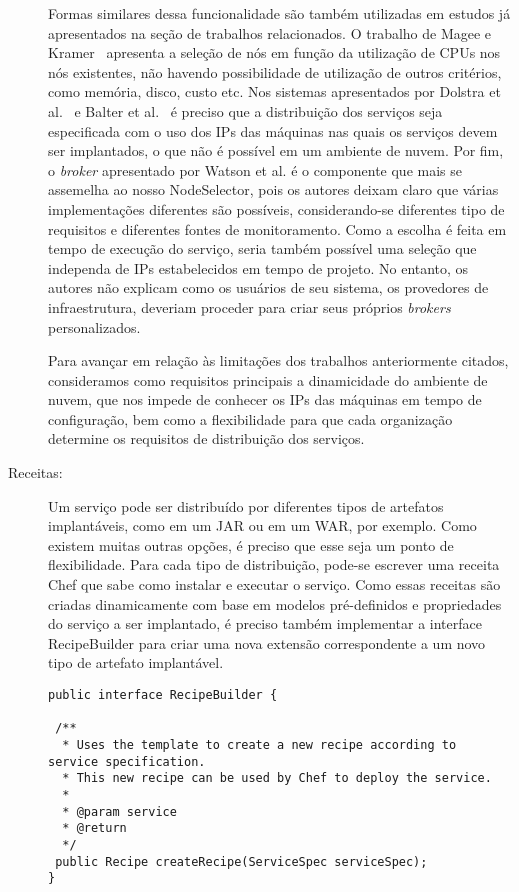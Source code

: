 \begin{description}
Formas similares dessa funcionalidade são também utilizadas em estudos já apresentados na seção de trabalhos relacionados.  O trabalho de Magee e Kramer~\cite{Magee1997Corba} apresenta a seleção de nós em função da utilização de CPUs nos nós existentes, não havendo possibilidade de utilização de outros critérios, como memória, disco, custo etc. Nos sistemas apresentados por Dolstra et al.~\cite{Dolstra2005Configuration} e Balter et al.~\cite{Balter1998Olan} é preciso que a distribuição dos serviços seja especificada com o uso dos IPs das máquinas nas quais os serviços devem ser implantados, o que não é possível em um ambiente de nuvem. Por fim, o \emph{broker} apresentado por Watson et al. é o componente que mais se assemelha ao nosso NodeSelector, pois os autores deixam claro que várias implementações diferentes são possíveis, considerando-se diferentes tipo de requisitos e diferentes fontes de monitoramento. Como a escolha é feita em tempo de execução do serviço, seria também possível uma seleção que independa de IPs estabelecidos em tempo de projeto. No entanto, os autores não explicam como os usuários de seu sistema, os provedores de infraestrutura, deveriam proceder para criar seus próprios \emph{brokers} personalizados.

Para avançar em relação às limitações dos trabalhos anteriormente citados,  consideramos como requisitos principais a dinamicidade do ambiente de nuvem, que nos impede de conhecer os IPs das máquinas em tempo de configuração, bem como a flexibilidade para que cada organização determine os requisitos de distribuição dos serviços.

\item [Receitas:]

Um serviço pode ser distribuído por diferentes tipos de artefatos implantáveis, como em um JAR ou em um WAR, por exemplo. Como existem muitas outras opções, é preciso que esse seja um ponto de flexibilidade. Para cada tipo de distribuição, pode-se escrever uma receita Chef que sabe como instalar e executar o serviço. Como essas receitas são criadas dinamicamente com base em modelos pré-definidos e propriedades do serviço a ser implantado, é preciso também implementar a interface RecipeBuilder para criar uma nova extensão correspondente a um novo tipo de artefato implantável.

\begin{lstlisting}[frame=trbl, label=lst:recipe_builder, caption=Interface RecipeBuilder]
public interface RecipeBuilder {
	
 /**
  * Uses the template to create a new recipe according to service specification.
  * This new recipe can be used by Chef to deploy the service.
  * 
  * @param service
  * @return
  */
 public Recipe createRecipe(ServiceSpec serviceSpec);
}
\end{lstlisting}


\end{description}
